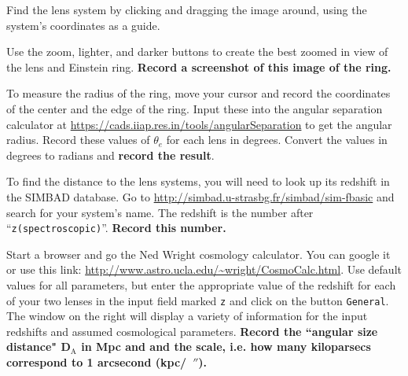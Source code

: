\begin{steps}

	\item Find the lens system by clicking and dragging the image around, using the system's coordinates as a guide.
	
	\item Use the zoom, lighter, and darker buttons to create the best zoomed in view of the lens and Einstein ring. \textbf{Record a screenshot of this image of the ring.}
	
	\item To measure the radius of the ring, move your cursor and record the coordinates of the center and the edge of the ring. Input these into the angular separation calculator at \url{https://cads.iiap.res.in/tools/angularSeparation} to get the angular radius. Record these values of $\theta_e$ for
		each lens in degrees. Convert the values in degrees to radians
		and \textbf{record the result}.

	\item To find the distance to the lens systems, you will need to look up its redshift in the SIMBAD database. Go to \url{http://simbad.u-strasbg.fr/simbad/sim-fbasic} and search for your system's name. The redshift is the number after ``\texttt{z(spectroscopic)}''. \textbf{Record this number.}
	
	
	\item Start a browser and go the Ned Wright cosmology calculator. You
	can google it or use this link: \url{http://www.astro.ucla.edu/~wright/CosmoCalc.html}. Use
	default values for all parameters, but enter the appropriate value
	of the redshift for each of your two lenses in the input field
	marked \texttt{z} and click on the button \texttt{General}. The window on
	the right will display a variety of information for the input
	redshifts and assumed cosmological parameters. \textbf{Record the ``angular
	size distance" D$_\textrm{A}$ in Mpc and and the scale, i.e. how many kiloparsecs
	correspond to 1 arcsecond (kpc/\ $''$).}
	

\end{steps}
